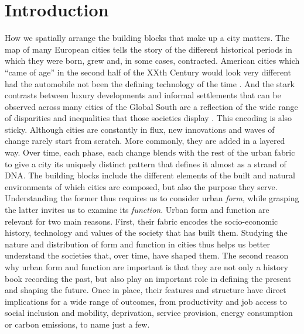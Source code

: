 \section{Introduction}
\label{sec:intro}

How we spatially arrange the building blocks that make up a city matters.
%
The map of many European cities tells the story of the different historical
periods in which they were born, grew and, in some cases, contracted.
%
American cities which ``came of age'' in the second half of the XXth Century
would look very different had the automobile not been the defining
technology of the time \citep{jacobs2016death}.
%
And the stark contrasts between luxury developments and informal settlements
that can be observed across many cities of the Global South are a reflection
of the wide range of disparities and inequalities that those societies
display \citep{alsayyad2003urban}.
%
This encoding is also sticky. Although cities are constantly in flux, new
innovations and waves of change rarely start from scratch. More commonly, they
are added in a layered way. Over time, each phase, each change blends with the rest
of the urban fabric to give a city its uniquely distinct pattern that defines
it almost as a strand of DNA.
The building blocks include the different
elements of the built and natural environments of which cities are composed,
but also the purpose they serve.
Understanding the former thus requires us to consider urban \textit{form}, while
grasping the latter invites us to examine its \textit{function}.
Urban form and function are relevant for two main reasons. First, their fabric
encodes the socio-economic history, technology and values
of the society that has built them.
%
Studying the nature and distribution
of form and function in cities thus helps us better understand the societies
that, over time, have shaped them.
The second reason why urban form and function are important is that they are
not only a history book recording the past, but also play an important role in
defining the present and shaping the future.
%
Once in place, their features and structure have direct implications for a
wide range of outcomes, from productivity and job access to social inclusion
and mobility, deprivation, service provision, energy consumption or carbon
emissions, to name just a few.


